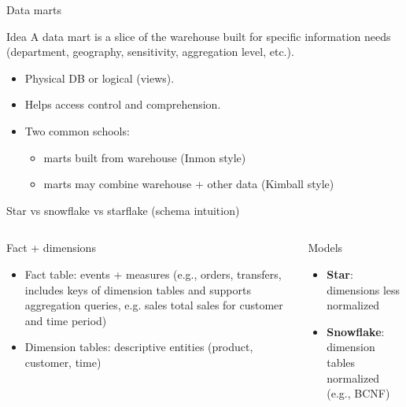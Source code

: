 \documentclass[10pt,aspectratio=169]{beamer}
\newenvironment{examplebox}[1][Example]{\begin{exampleblock}{#1}}{\end{exampleblock}}
\begin{document}
\begin{frame}{Data marts}
\begin{block}{Idea}
A data mart is a slice of the warehouse built for specific information needs
(department, geography, sensitivity, aggregation level, etc.).
\end{block}
\begin{itemize}
  \item Physical DB or logical (views).
  \item Helps access control and comprehension.
  \item Two common schools:
  \begin{itemize}
    \item marts built from warehouse (Inmon style)
    \item marts may combine warehouse + other data (Kimball style)
  \end{itemize}
\end{itemize}
\end{frame}

\begin{frame}{Star vs snowflake vs starflake (schema intuition)}
\small
\begin{columns}[T,onlytextwidth]
\begin{block}{Fact + dimensions}
\begin{itemize}
  \item Fact table: events + measures (e.g., orders, transfers, includes keys of dimension tables and supports aggregation queries, e.g. sales total sales for customer and time period)
  \item Dimension tables: descriptive entities (product, customer, time)
\end{itemize}
\end{block}
\begin{examplebox}[Models]
\begin{itemize}
  \item \textbf{Star}: dimensions less normalized
  \item \textbf{Snowflake}: dimension tables normalized (e.g., BCNF)
\end{itemize}
\end{examplebox}

\centering
{}
\end{columns}
\end{frame}
\end{document}
